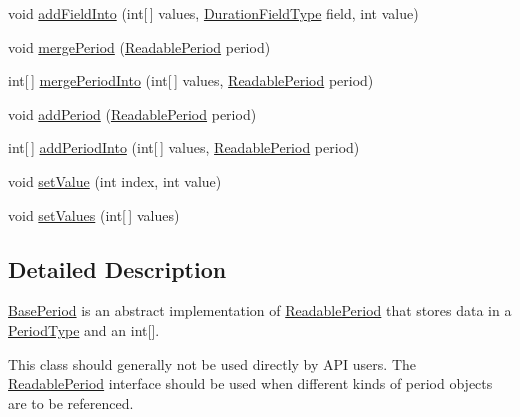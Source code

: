 \begin{DoxyCompactItemize}
\item 
void \hyperlink{classorg_1_1joda_1_1time_1_1base_1_1_base_period_a7b7d3a7d7341fa4c6800cb3a2b6a29b6}{add\-Field\-Into} (int\mbox{[}$\,$\mbox{]} values, \hyperlink{classorg_1_1joda_1_1time_1_1_duration_field_type}{Duration\-Field\-Type} field, int value)
\item 
void \hyperlink{classorg_1_1joda_1_1time_1_1base_1_1_base_period_a9a4b09aee3ff3625bf3eb4a41a69e0e1}{merge\-Period} (\hyperlink{interfaceorg_1_1joda_1_1time_1_1_readable_period}{Readable\-Period} period)
\item 
int\mbox{[}$\,$\mbox{]} \hyperlink{classorg_1_1joda_1_1time_1_1base_1_1_base_period_a3770579e67f363e90a3b925b4b7af3b4}{merge\-Period\-Into} (int\mbox{[}$\,$\mbox{]} values, \hyperlink{interfaceorg_1_1joda_1_1time_1_1_readable_period}{Readable\-Period} period)
\item 
void \hyperlink{classorg_1_1joda_1_1time_1_1base_1_1_base_period_aa770084301e2c10f52b3693cbef9ef4b}{add\-Period} (\hyperlink{interfaceorg_1_1joda_1_1time_1_1_readable_period}{Readable\-Period} period)
\item 
int\mbox{[}$\,$\mbox{]} \hyperlink{classorg_1_1joda_1_1time_1_1base_1_1_base_period_ad7a4222fe04b8e234df8620ef7abb134}{add\-Period\-Into} (int\mbox{[}$\,$\mbox{]} values, \hyperlink{interfaceorg_1_1joda_1_1time_1_1_readable_period}{Readable\-Period} period)
\item 
void \hyperlink{classorg_1_1joda_1_1time_1_1base_1_1_base_period_ad87bddf56babb3c01d59a4b67f0d9e90}{set\-Value} (int index, int value)
\item 
void \hyperlink{classorg_1_1joda_1_1time_1_1base_1_1_base_period_abddbc8af6d7da464c671bc33135101d4}{set\-Values} (int\mbox{[}$\,$\mbox{]} values)
\end{DoxyCompactItemize}


\subsection{Detailed Description}
\hyperlink{classorg_1_1joda_1_1time_1_1base_1_1_base_period}{Base\-Period} is an abstract implementation of \hyperlink{interfaceorg_1_1joda_1_1time_1_1_readable_period}{Readable\-Period} that stores data in a {\ttfamily \hyperlink{classorg_1_1joda_1_1time_1_1_period_type}{Period\-Type}} and an {\ttfamily int\mbox{[}\mbox{]}}. 

This class should generally not be used directly by A\-P\-I users. The \hyperlink{interfaceorg_1_1joda_1_1time_1_1_readable_period}{Readable\-Period} interface should be used when different kinds of period objects are to be referenced. 


